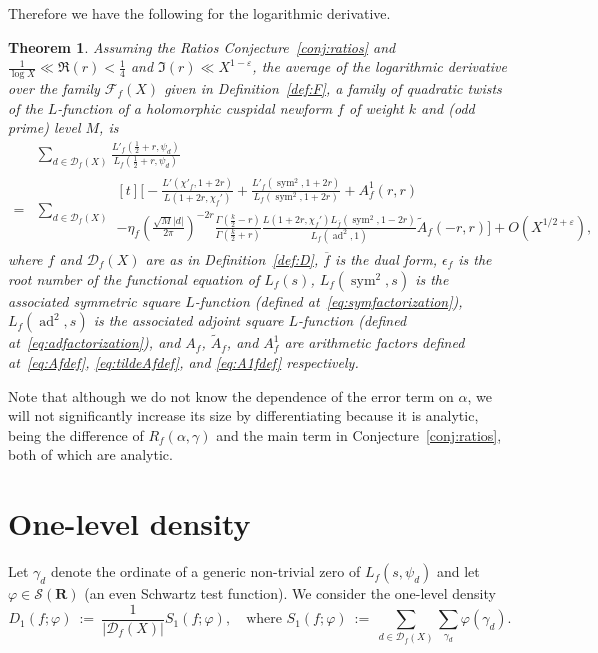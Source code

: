 \documentclass[11pt,reqno]{amsart} \usepackage{fullpage}
\newtheorem{theorem}[lemma]{Theorem}
\newcommand{\R}{\ensuremath{\mathbf{R}}}
\newcommand{\F}{\ensuremath{\mathbf{F}}}
\newcommand{\ep}{\epsilon}
\newcommand{\vep}{\varepsilon}
\newcommand\be{\begin{equation}}
\newcommand\ee{\end{equation}}
\newcommand{\Lchi}[2][]{L(#2,\chi_f#1)}
\DeclareMathOperator{\sym}{sym}
\DeclareMathOperator{\ad}{ad}
\newcommand{\D}{\mathcal D_f}
\renewcommand{\F}{\mathcal F_f}
\numberwithin{equation}{section}
\begin{document}
Therefore we have the following for the logarithmic derivative.
\begin{theorem}\label{thm:logderiv}
  Assuming the Ratios Conjecture~\ref{conj:ratios} and $\tfrac1{\log X}\ll\Re(r)<\tfrac14$
  and $\Im(r)\ll X^{1-\vep}$, the average of the logarithmic derivative over the family
  $\F(X)$ given in Definition~\ref{def:F}, a family of quadratic twists of the
  $L$-function of a holomorphic cuspidal newform $f$ of weight $k$ and (odd prime) level
  $M$, is
  \be\label{eq:logderiv}\begin{aligned}
    &\sum_{d\in\D(X)}
    \frac{L'_f\left(\frac12+r,\psi_d\right)}{L_f\left(\frac12+r,\psi_d\right)}
    \\ =
    &\sum_{d\in\D(X)}
    \begin{multlined}[t]
      \Bigg[-\frac{L'(\chi'_f,1+2r)}{\Lchi[']{1+2r}}
      +\frac{L'_f(\sym^2,1+2r)}{L_f(\sym^2,1+2r)}+A_f^1(r,r) \\
      -\eta_f\left(\frac{\sqrt M |d|}{2\pi}\right)^{-2r}
      \frac{\Gamma\left(\frac k2-r\right)}{\Gamma\left(\frac k2+r\right)}
      \frac{\Lchi[']{1+2r}L_{\overline f}(\sym^2,1-2r)}
      {L_f(\ad^2,1)}\tilde{A}_f(-r,r)\Bigg]
      +O(X^{1/2+\vep}),
    \end{multlined}
  \end{aligned}
  \ee
  where $f$ and $\D(X)$ are as in Definition~\ref{def:D}, $\overline f$ is the dual form,
  $\ep_f$ is the root number of the functional equation of $L_f(s)$, $L_f(\sym^2,s)$ is the
  associated symmetric square $L$-function (defined at~\eqref{eq:symfactorization}),
  $L_f(\ad^2,s)$ is the associated adjoint square $L$-function
  (defined at~\eqref{eq:adfactorization}), and $A_f$, $\tilde A_f$, and $A^1_f$ are
  arithmetic factors defined at~\eqref{eq:Afdef}, \eqref{eq:tildeAfdef}, and
  \eqref{eq:A1fdef} respectively.
\end{theorem}
Note that although we do not know the dependence of the error term on $\alpha$,
we will not significantly increase its size by differentiating because it is
analytic, being the difference of $R_f(\alpha,\gamma)$ and the main term in
Conjecture~\ref{conj:ratios}, both of which are analytic.
\section{One-level density}\label{sec:1ld}
Let $\gamma_d$ denote the ordinate of a generic non-trivial zero of
$L_f(s,\psi_d)$ and let $\varphi\in\mathcal S(\R)$
(an even Schwartz test function). We consider the one-level density
\be D_1(f;\varphi)\ :=\ \frac1{\left|\D(X)\right|} S_1(f;\varphi),\quad\text{where }
S_1(f;\varphi)\ :=\ \sum_{d\in\D(X)}\sum_{\gamma_d}\varphi(\gamma_d). \ee
\end{document}
